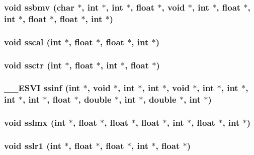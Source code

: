\subsubsection{\setlength{\rightskip}{0pt plus 5cm}void ssbmv (char $\ast$, int $\ast$, int $\ast$, float $\ast$, void $\ast$, int $\ast$, float $\ast$, int $\ast$, float $\ast$, float $\ast$, int $\ast$)}\label{essl_8h_22cffb69f6cb9357fb1db3b9dcdc9c3a}


\subsubsection{\setlength{\rightskip}{0pt plus 5cm}void sscal (int $\ast$, float $\ast$, float $\ast$, int $\ast$)}\label{essl_8h_edbe89ae7a3393dae260460b24343e9a}


\subsubsection{\setlength{\rightskip}{0pt plus 5cm}void ssctr (int $\ast$, float $\ast$, int $\ast$, float $\ast$)}\label{essl_8h_2912f368dad960b0354cab6a7d51845c}


\subsubsection{\setlength{\rightskip}{0pt plus 5cm}\_\-\_\-ESVI ssinf (int $\ast$, void $\ast$, int $\ast$, int $\ast$, void $\ast$, int $\ast$, int $\ast$, int $\ast$, int $\ast$, float $\ast$, double $\ast$, int $\ast$, double $\ast$, int $\ast$)}\label{essl_8h_e695918fec76ef0c9e2b520607c14b8b}


\subsubsection{\setlength{\rightskip}{0pt plus 5cm}void sslmx (int $\ast$, float $\ast$, float $\ast$, float $\ast$, int $\ast$, float $\ast$, int $\ast$)}\label{essl_8h_e6a4fd54e507b0b71bb01dc2be41ef05}


\subsubsection{\setlength{\rightskip}{0pt plus 5cm}void sslr1 (int $\ast$, float $\ast$, float $\ast$, int $\ast$, float $\ast$)}\label{essl_8h_e37b01850403b0ff8f4b6a3255fc2544}



